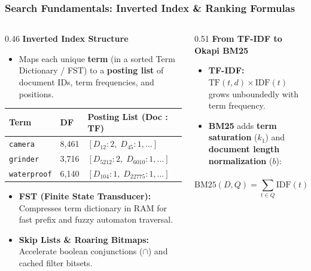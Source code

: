 \documentclass[aspectratio=169]{beamer}
\begin{document}
\begin{frame}
\frametitle{Search Fundamentals: Inverted Index \& Ranking Formulas}
\begin{columns}[T]
\begin{column}{0.46\textwidth}
\textbf{Inverted Index Structure} \cite{inverted}
\scriptsize
\begin{itemize}
    \item Maps each unique \textbf{term} (in a sorted Term Dictionary / FST) to a \textbf{posting list} of document IDs, term frequencies, and positions.
\end{itemize}
\vspace{0.05cm}
\centering
\tiny
\begin{tabular}{lll}
\toprule
\textbf{Term} & \textbf{DF} & \textbf{Posting List (Doc : TF)} \\
\midrule
\texttt{camera}     & 8,461 & $[D_{12}: 2, \; D_{45}: 1, \dots]$ \\
\texttt{grinder}    & 3,716 & $[D_{5212}: 2, \; D_{6010}: 1, \dots]$ \\
\texttt{waterproof} & 6,140 & $[D_{104}: 1, \; D_{22775}: 1, \dots]$ \\
\bottomrule
\end{tabular}
\vspace{0.1cm}
\raggedright
\scriptsize
\begin{itemize}
    \item \textbf{FST (Finite State Transducer):} Compresses term dictionary in RAM for fast prefix and fuzzy automaton traversal.
    \item \textbf{Skip Lists \& Roaring Bitmaps:} Accelerate boolean conjunctions ($\cap$) and cached filter bitsets.
\end{itemize}
\end{column}
\begin{column}{0.51\textwidth}
\textbf{From TF-IDF to Okapi BM25} \cite{bm25}
\scriptsize
\begin{itemize}
    \item \textbf{TF-IDF:} $\text{TF}(t,d) \times \text{IDF}(t)$ grows unboundedly with term frequency.
    \item \textbf{BM25} adds \textbf{term saturation} ($k_1$) and \textbf{document length normalization} ($b$):
\end{itemize}
\vspace{-0.2cm}
{\tiny
\[
\text{BM25}(D, Q) = \sum_{t \in Q} \text{IDF}(t) \cdot \frac{f(t, D) \cdot (k_1 + 1)}{f(t, D) + k_1 \cdot \left(1 - b + b \cdot \frac{|D|}{\text{avgdl}}\right)}
\]}
\end{column}
\end{columns}
\end{frame}
\end{document}
